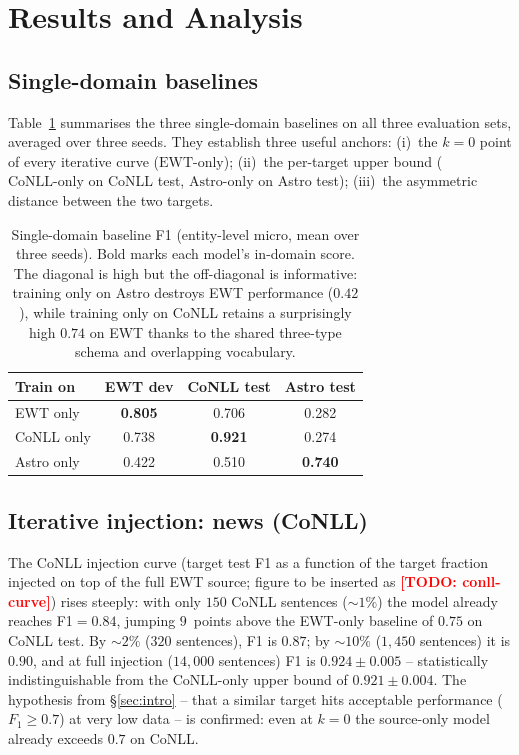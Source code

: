 \documentclass[11pt]{article}
\newcommand{\todo}[1]{\textcolor{red}{\textbf{[TODO: #1]}}}
\begin{document}
\section{Results and Analysis}
\label{sec:results}

\subsection{Single-domain baselines}

Table~\ref{tab:baselines} summarises the three single-domain baselines on
all three evaluation sets, averaged over three seeds. They establish three
useful anchors: (i)~the $k{=}0$ point of every iterative curve
($\text{EWT-only}$); (ii)~the per-target upper bound
($\text{CoNLL-only}$ on CoNLL test, $\text{Astro-only}$ on Astro test);
(iii)~the asymmetric distance between the two targets.

\begin{table}[t]
  \centering
  \small
  \begin{tabular}{lccc}
    \toprule
    \textbf{Train on} & \textbf{EWT dev} & \textbf{CoNLL test} & \textbf{Astro test} \\
    \midrule
    EWT only           & \textbf{0.805} & 0.706 & 0.282 \\
    CoNLL only         & 0.738 & \textbf{0.921} & 0.274 \\
    Astro only         & 0.422 & 0.510 & \textbf{0.740} \\
    \bottomrule
  \end{tabular}
  \caption{Single-domain baseline F1 (entity-level micro, mean over three
    seeds). Bold marks each model's in-domain score. The diagonal is high but
    the off-diagonal is informative: training only on Astro destroys
    EWT performance ($0.42$), while training only on CoNLL retains a
    surprisingly high $0.74$ on EWT thanks to the shared three-type schema
    and overlapping vocabulary.}
  \label{tab:baselines}
\end{table}

\subsection{Iterative injection: news (CoNLL)}
\label{sec:res-conll}

The CoNLL injection curve (target test F1 as a function of the target
fraction injected on top of the full EWT source; figure to be inserted as
\todo{conll-curve}) rises steeply: with only $150$ CoNLL sentences
($\sim$$1\%$) the model already
reaches F1$=0.84$, jumping $9$~points above the EWT-only baseline of
$0.75$ on CoNLL test. By $\sim$$2\%$ ($320$ sentences), F1 is
$0.87$; by $\sim$$10\%$ ($1{,}450$ sentences) it is $0.90$, and at full
injection ($14{,}000$ sentences) F1 is $0.924\pm 0.005$ -- statistically
indistinguishable from the $\text{CoNLL-only}$ upper bound of
$0.921\pm 0.004$. The hypothesis from \S\ref{sec:intro} -- that a similar
target hits acceptable performance ($F_1{\geq}0.7$) at very low data --
is confirmed: even at $k{=}0$ the source-only model already exceeds
$0.7$ on CoNLL.
\end{document}
